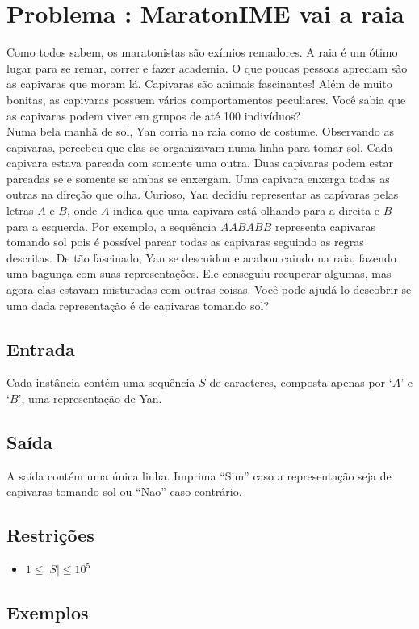 \section*{Problema \proxLetra: MaratonIME vai a raia}

Como todos sabem, os maratonistas são exímios remadores. A raia é um ótimo lugar para se remar, correr e fazer academia. O que poucas pessoas apreciam são as capivaras que moram lá. Capivaras são animais fascinantes! Além de muito bonitas, as capivaras possuem vários comportamentos peculiares. Você sabia que as capivaras podem viver em grupos de até 100 indivíduos?\\
Numa bela manhã de sol, Yan corria na raia como de costume. Observando as capivaras, percebeu que elas se organizavam numa linha para tomar sol. Cada capivara estava pareada com somente uma outra. Duas capivaras podem estar pareadas se e somente se ambas se enxergam. Uma capivara enxerga todas as outras na direção que olha. 
Curioso, Yan decidiu representar as capivaras pelas letras $A$ e $B$, onde $A$ indica que uma capivara está olhando para a direita e $B$ para a esquerda.
Por exemplo, a sequência $AABABB$ representa capivaras tomando sol pois é possível parear todas as capivaras seguindo as regras descritas. De tão fascinado, Yan se descuidou e acabou caindo na raia, fazendo uma bagunça com suas representações. Ele conseguiu recuperar algumas, mas agora elas estavam misturadas com outras coisas. Você pode ajudá-lo descobrir se uma dada representação é de capivaras tomando sol?

\subsection*{Entrada}
\textoDiversasInstanciasEOF

Cada instância contém uma sequência $S$ de caracteres, composta apenas por `$A$' e `$B$', uma representação de Yan.

\subsection*{Saída}

A saída contém uma única linha. Imprima ``Sim'' caso a representação seja de capivaras tomando sol ou ``Nao'' caso contrário.


\subsection*{Restrições}
\begin{itemize}
  \item $1 \leq |S| \leq 10^5$
\end{itemize}

\subsection*{Exemplos}

